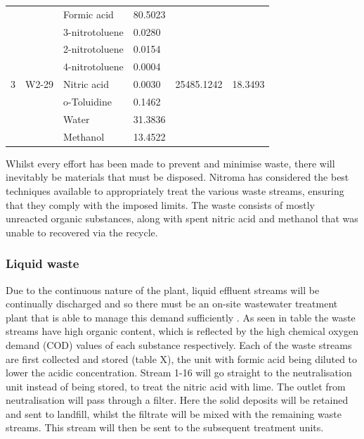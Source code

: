 \begin{table}[]
{\begin{tabular}{@{}llllll@{}}
 &  & Formic acid & 80.5023 &  &  \\
\multirow{7}{*}{3} & \multirow{7}{*}{W2-29} & 3-nitrotoluene & 0.0280 & \multirow{7}{*}{25485.1242} & \multirow{7}{*}{18.3493} \\
 &  & 2-nitrotoluene & 0.0154 &  &  \\
 &  & 4-nitrotoluene & 0.0004 &  &  \\
 &  & Nitric acid & 0.0030 &  &  \\
 &  & o-Toluidine & 0.1462 &  &  \\
 &  & Water & 31.3836 &  &  \\
 &  & Methanol & 13.4522 &  &  \\ \cmidrule(lr){3-4}
\end{tabular}%
}
\end{table}


Whilst every effort has been made to prevent and minimise waste, there will inevitably be materials that must be disposed. Nitroma has considered the best techniques available to appropriately treat the various waste streams, ensuring that they comply with the imposed limits. The waste consists of mostly unreacted organic substances, along with spent nitric acid and methanol that was unable to recovered via the recycle. 

\subsubsection{Liquid waste }

Due to the continuous nature of the plant, liquid effluent streams will be continually discharged and so there must be an on-site wastewater treatment plant that is able to manage this demand sufficiently \cite{water_innovations_inc_continuous_2021}.  As seen in table %
the waste streams have high organic content, which is reflected by the high chemical oxygen demand (COD) values of each substance respectively. Each of the waste streams are first collected and stored (table X), the unit with formic acid being diluted to lower the acidic concentration. Stream 1-16 will go straight to the neutralisation unit instead of being stored, to treat the nitric acid with lime. The outlet from neutralisation will pass through a filter. Here the solid deposits will be retained and sent to landfill, whilst the filtrate will be mixed with the remaining waste streams. This stream will then be sent to the subsequent treatment units. 


